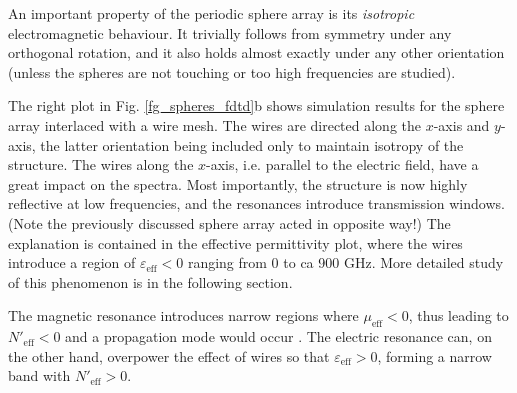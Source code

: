 \documentclass[letterpaper,12pt]{report}
\begin{document}
An important property of the periodic sphere array is its \textit{isotropic} electromagnetic behaviour. It trivially follows from symmetry under any orthogonal rotation, and it also holds almost exactly under any other orientation (unless the spheres are not touching or too high frequencies are studied).

The right plot in Fig. \ref{fg_spheres_fdtd}b shows simulation results for the sphere array interlaced with a wire mesh. The wires are directed along the $x$-axis and $y$-axis, the latter orientation being included only to maintain isotropy of the structure. The wires along the $x$-axis, i.e. parallel to the electric field, have a great impact on the spectra. Most importantly, the structure is now highly reflective at low frequencies, and the resonances introduce transmission windows. (Note the previously discussed sphere array acted in opposite way!) The explanation is contained in the effective permittivity plot, where the wires introduce a region of $\varepsilon_{\text{eff}} < 0$  ranging from 0 to ca 900 GHz. More detailed study of this phenomenon is in the following section.

The magnetic resonance introduces narrow regions where $\mu_{\text{eff}} < 0$, thus leading to $N'_{\text{eff}} < 0$ and a propagation mode would occur \cite{dominec2013resonant}. The electric resonance can, on the other hand, overpower the effect of wires so that $\varepsilon_{\text{eff}} > 0$, forming a narrow band with $N'_{\text{eff}} > 0$.
\end{document}
